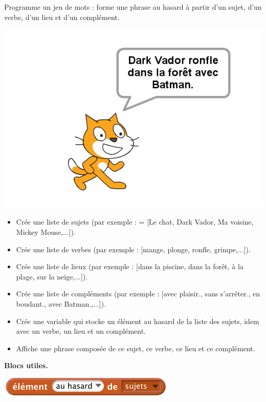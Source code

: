 \documentclass[class=report,crop=false, 12pt]{standalone}
\begin{document}
\begin{activite}

Programme un jeu de mots : forme une phrase au hasard à partir d'un sujet, d'un verbe, d'un lieu et d'un complément.

\begin{center}
  \includegraphics[scale=\scaleecran,scale=1.2]{ecran-12-ex2} 
\end{center}

\begin{itemize}
  \item Crée une liste de sujets (par exemple :  = [Le chat, Dark Vador, Ma voisine, Mickey Mouse,...]).
  \item Crée une liste de verbes (par exemple : [mange, plonge, ronfle, grimpe,...]).
  \item Crée une liste de lieux (par exemple : [dans la piscine, dans la forêt, à la plage, sur la neige,...]).  
  \item Crée une liste de compléments (par exemple : [avec plaisir., sans s'arrêter., en boudant., avec Batman.,...]). 
  \item Crée une variable  qui stocke un élément au hasard de la liste des sujets, idem avec un verbe, un lieu et un complément.
  \item Affiche une phrase composée de ce sujet, ce verbe, ce lieu et ce complément.
\end{itemize}



\bigskip

\textbf{Blocs utiles.}



\begin{center}
  \includegraphics[scale=\scalebloc]{bloc-12-ex2} 
\end{center} 
  
\end{activite}
\end{document}
